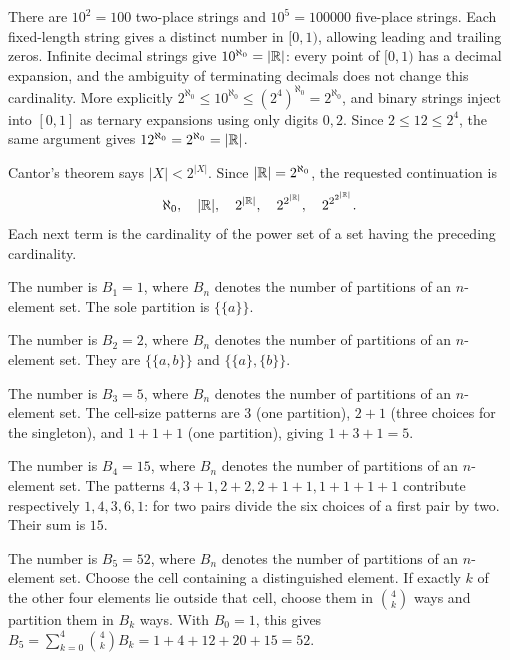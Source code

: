 
There are $10^2=100$ two-place strings and $10^5=100000$ five-place strings. Each fixed-length string gives a distinct number in $[0,1)$, allowing leading and trailing zeros. Infinite decimal strings give $10^{\aleph_0}=|\mathbb{R}|$: every point of $[0,1)$ has a decimal expansion, and the ambiguity of terminating decimals does not change this cardinality. More explicitly $2^{\aleph_0}\le10^{\aleph_0}\le(2^4)^{\aleph_0}=2^{\aleph_0}$, and binary strings inject into $[0,1]$ as ternary expansions using only digits $0,2$. Since $2\le12\le2^4$, the same argument gives $12^{\aleph_0}=2^{\aleph_0}=|\mathbb{R}|$.


Cantor's theorem says $|X|<2^{|X|}$. Since $|\mathbb{R}|=2^{\aleph_0}$, the requested continuation is
\[\aleph_0,\quad |\mathbb{R}|,\quad 2^{|\mathbb{R}|},\quad 2^{2^{|\mathbb{R}|}},\quad 2^{2^{2^{|\mathbb{R}|}}}.\]
Each next term is the cardinality of the power set of a set having the preceding cardinality.


The number is $B_1=1$, where $B_n$ denotes the number of partitions of an $n$-element set. The sole partition is $\{\{a\}\}$.


The number is $B_2=2$, where $B_n$ denotes the number of partitions of an $n$-element set. They are $\{\{a,b\}\}$ and $\{\{a\},\{b\}\}$.


The number is $B_3=5$, where $B_n$ denotes the number of partitions of an $n$-element set. The cell-size patterns are $3$ (one partition), $2+1$ (three choices for the singleton), and $1+1+1$ (one partition), giving $1+3+1=5$.


The number is $B_4=15$, where $B_n$ denotes the number of partitions of an $n$-element set. The patterns $4,3+1,2+2,2+1+1,1+1+1+1$ contribute respectively $1,4,3,6,1$: for two pairs divide the six choices of a first pair by two. Their sum is $15$.


The number is $B_5=52$, where $B_n$ denotes the number of partitions of an $n$-element set. Choose the cell containing a distinguished element. If exactly $k$ of the other four elements lie outside that cell, choose them in $\binom4k$ ways and partition them in $B_k$ ways. With $B_0=1$, this gives $B_5=\sum_{k=0}^4\binom4k B_k=1+4+12+20+15=52$.

